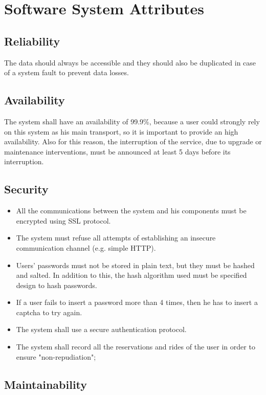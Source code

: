 \section{Software System Attributes}

\subsection{Reliability}
The data should always be accessible and they should also be duplicated in case
of a system fault to prevent data losses.

\subsection{Availability}
The system shall have an availability of 99.9\%, because a user could strongly rely on this system as his main transport, so it is important to provide an high availability. Also for this reason, the interruption of the service, due to upgrade or maintenance interventions, must be announced at least 5 days before its interruption. 

\subsection{Security}
\begin{itemize}
\item All the communications between the system and his components must be encrypted using SSL protocol.
\item The system must refuse all attempts of establishing an insecure communication channel (e.g. simple HTTP).
\item Users' passwords must not be stored in plain text, but they must be hashed and salted. In addition to this, the hash algorithm used must be specified design to hash passwords.
\item If a user fails to insert a password more than 4 times, then he has to insert a captcha to try again.
\item The system shall use a secure authentication protocol.
\item The system shall record all the reservations and rides of the user in order to ensure "non-repudiation";
\end{itemize}


\subsection{Maintainability}

